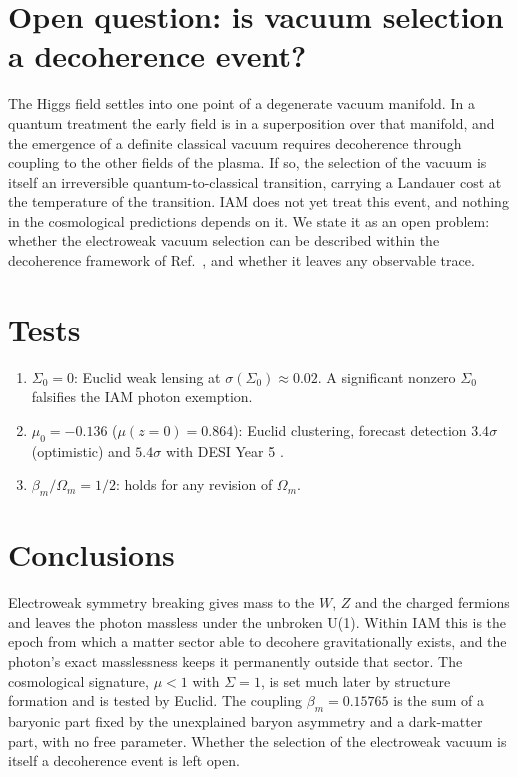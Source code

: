 \documentclass[12pt,a4paper]{article}
\begin{document}
\section{Open question: is vacuum selection a decoherence event?}
\label{sec:open}

The Higgs field settles into one point of a degenerate vacuum manifold. In a
quantum treatment the early field is in a superposition over that manifold, and the
emergence of a definite classical vacuum requires decoherence through coupling to
the other fields of the plasma. If so, the selection of the vacuum is itself an
irreversible quantum-to-classical transition, carrying a Landauer cost at the
temperature of the transition. IAM does not yet treat this event, and nothing in the
cosmological predictions depends on it. We state it as an open problem: whether the
electroweak vacuum selection can be described within the decoherence framework of
Ref.~\citep{mahaffey2026}, and whether it leaves any observable trace.

\section{Tests}
\label{sec:tests}

\begin{enumerate}
  \item $\Sigma_0=0$: Euclid weak lensing at $\sigma(\Sigma_0)\approx0.02$. A
  significant nonzero $\Sigma_0$ falsifies the IAM photon exemption.
  \item $\mu_0=-0.136$ ($\mu(z=0)=0.864$): Euclid clustering, forecast detection
  $3.4\sigma$ (optimistic) and $5.4\sigma$ with DESI Year 5 \citep{mahaffey2026}.
  \item $\beta_m/\Omega_m=1/2$: holds for any revision of $\Omega_m$.
\end{enumerate}

\section{Conclusions}

Electroweak symmetry breaking gives mass to the $W$, $Z$ and the charged fermions
and leaves the photon massless under the unbroken U(1). Within IAM this is the epoch
from which a matter sector able to decohere gravitationally exists, and the photon's
exact masslessness keeps it permanently outside that sector. The cosmological
signature, $\mu<1$ with $\Sigma=1$, is set much later by structure formation and is
tested by Euclid. The coupling $\beta_m=0.15765$ is the sum of a baryonic part fixed
by the unexplained baryon asymmetry and a dark-matter part, with no free parameter.
Whether the selection of the electroweak vacuum is itself a decoherence event is
left open.
\end{document}
